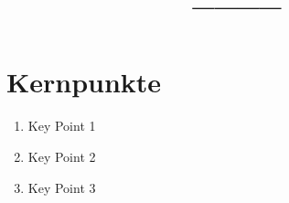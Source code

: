\documentclass{article}
\title{____}
\date{} %
\begin{document}
\maketitle %
\thispagestyle{fancy} %
\hypertarget{toc}{}



\tableofcontents %
\listoftables
\listoffigures
\hypersetup{
  linkcolor = red!70!black,
  citecolor = black, %
  urlcolor = blue    %
}





\section*{Kernpunkte} %
\begin{enumerate}
    \item Key Point 1
    \item Key Point 2
    \item Key Point 3
\end{enumerate}


\begin{multicols}{2}



    


\end{multicols}
\vspace{20 mm} %
\printbibliography
\end{document}
